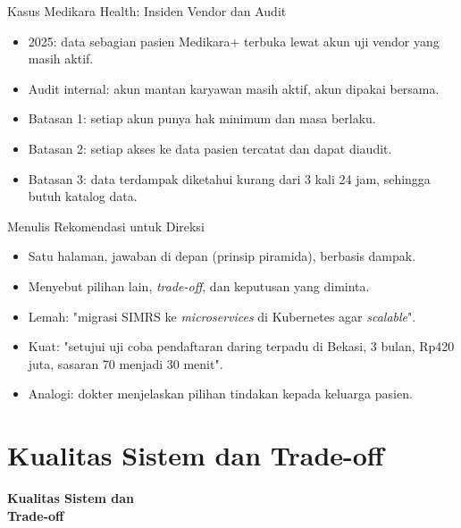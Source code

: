 \documentclass[aspectratio=169, table, 12pt]{beamer}
\begin{document}
\begin{frame}{Kasus Medikara Health: Insiden Vendor dan Audit}
  \begin{itemize}
    \item 2025: data sebagian pasien Medikara+ terbuka lewat akun uji vendor yang
          masih aktif.
    \item Audit internal: akun mantan karyawan masih aktif, akun dipakai bersama.
    \item Batasan 1: setiap akun punya hak minimum dan masa berlaku.
    \item Batasan 2: setiap akses ke data pasien tercatat dan dapat diaudit.
    \item Batasan 3: data terdampak diketahui kurang dari 3 kali 24 jam, sehingga
          butuh katalog data.
  \end{itemize}
\end{frame}

\begin{frame}{Menulis Rekomendasi untuk Direksi}
  \begin{itemize}
    \item Satu halaman, jawaban di depan (prinsip piramida), berbasis dampak.
    \item Menyebut pilihan lain, \textit{trade-off}, dan keputusan yang diminta.
    \item Lemah: "migrasi SIMRS ke \textit{microservices} di Kubernetes agar
          \textit{scalable}".
    \item Kuat: "setujui uji coba pendaftaran daring terpadu di Bekasi, 3 bulan,
          Rp420 juta, sasaran 70 menjadi 30 menit".
    \item Analogi: dokter menjelaskan pilihan tindakan kepada keluarga pasien.
  \end{itemize}
\end{frame}

\section{Kualitas Sistem dan Trade-off}

\begin{frame}{\hfill}
  \centering
  \Huge{\textbf{Kualitas Sistem dan\\Trade-off}}
\end{frame}
\end{document}
